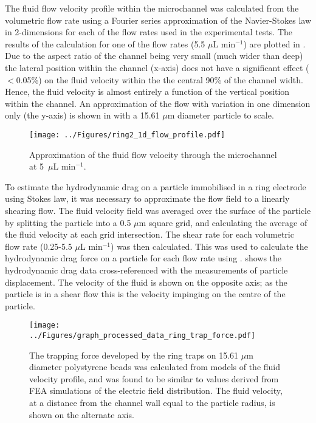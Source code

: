 The fluid flow velocity profile within the microchannel was calculated from the volumetric flow rate using a Fourier series approximation of the Navier-Stokes law in 2-dimensions for each of the flow rates used in the experimental tests. The results of the calculation for one of the flow rates (5.5 $\mu$L min$^{-1}$) are plotted in . Due to the aspect ratio of the channel being very small (much wider than deep) the lateral position within the channel (x-axis) does not have a significant effect ($<$0.05\%) on the fluid velocity within the the central 90\% of the channel width. Hence, the fluid velocity is almost entirely a function of the vertical position within the channel. An approximation of the flow with variation in one dimension only (the y-axis) is shown in  with a 15.61 $\mu$m diameter particle to scale. 

\begin{figure}
	\centering
		\texttt{[image: ../Figures/ring2\_1d\_flow\_profile.pdf]}
	\caption{Approximation of the fluid flow velocity through the microchannel at 5~$\mu$L min$^{-1}$.}
	\label{fig:ring2_1d_flow_profile}
\end{figure}

To estimate the hydrodynamic drag on a particle immobilised in a ring electrode using Stokes law, it was necessary to approximate the flow field to a linearly shearing flow. The fluid velocity field was averaged over the surface of the particle by splitting the particle into a 0.5 $\mu$m square grid, and calculating the average of the fluid velocity at each grid intersection. The shear rate for each volumetric flow rate (0.25-5.5 $\mu$L min$^{-1}$) was then calculated. This was used to calculate the hydrodynamic drag force on a particle for each flow rate using .  shows the hydrodynamic drag data cross-referenced with the measurements of particle displacement. The velocity of the fluid is shown on the opposite axis; as the particle is in a shear flow this is the velocity impinging on the centre of the particle.

\begin{figure}
	\centering
		\texttt{[image: ../Figures/graph\_processed\_data\_ring\_trap\_force.pdf]}
	\caption[Plot of the trapping force developed by the ring traps on 15.61 $\mu$m diameter polystyrene beads.]{The trapping force developed by the ring traps on 15.61 $\mu$m diameter polystyrene beads was calculated from models of the fluid velocity profile, and was found to be similar to values derived from FEA simulations of the electric field distribution. The fluid velocity, at a distance from the channel wall equal to the particle radius, is shown on the alternate axis.}
	\label{fig:graph_processed_data_ring_trap_force}
\end{figure}

